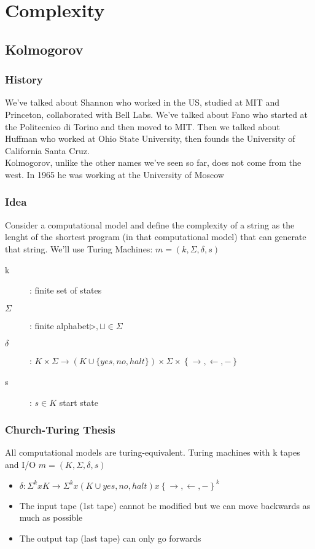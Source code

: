 \section*{Complexity}
    \subsection*{Kolmogorov}
        \subsubsection*{History}
        We've talked about Shannon who worked in the US, studied at MIT and Princeton, collaborated with Bell Labs.
        We've talked about Fano who started at the Politecnico di Torino and then moved to MIT.
        Then we talked about Huffman who worked at Ohio State University, then founds the University of California Santa Cruz.\\
        Kolmogorov, unlike the other names we've seen so far, does not come from the west. In 1965 he was working at the University of Moscow\\
        \subsubsection*{Idea}
        Consider a computational model and define the complexity of a string as the lenght of the shortest program (in that computational model)
        that can generate that string. We'll use Turing Machines: $m = (k, \Sigma,\delta, s)$
        \begin{description}
            \item[k]: finite set of states
            \item[$\Sigma$]: finite alphabet\quad  $\triangleright, \sqcup \in \Sigma$
            \item[$\delta$]: $K \times \Sigma \longrightarrow (K\cup\{yes, no, halt\}) \times  \Sigma \times \left\{\rightarrow, \leftarrow, -\right\}$
            \item[s]: $s \in K$ start state
        \end{description}
    \subsubsection*{Church-Turing Thesis}
    All computational models are turing-equivalent.\newline
    Turing machines with k tapes and I/O
    $m=(K,\Sigma, \delta, s)$
    \begin{itemize}
        \item $\delta: \Sigma^k x K \rightarrow \Sigma^k x (K \cup {yes, no, halt}) x \left\{ \rightarrow, \leftarrow, - \right\}^k$
        \item The input tape (1st tape) cannot be modified but we can move backwards as much as possible
        \item The output tap (last tape) can only go forwards
    \end{itemize}
